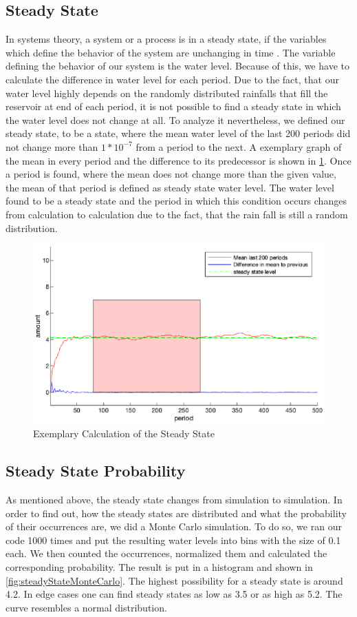 \documentclass[12pt, a4paper, oneside]{article}
\begin{document}
\subsection{Steady State}
In systems theory, a system or a process is in a steady state, if the variables which define the behavior of the system are unchanging in time \citep{gagniuc2017markov}. 
The variable defining the behavior of our system is the water level. 
Because of this, we have to calculate the difference in water level for each period. 
Due to the fact, that our water level highly depends on the randomly distributed rainfalls that fill the reservoir at end of each period, it is not possible to find a steady state in which the water level does not change at all. 
To analyze it nevertheless, we defined our steady state, to be a state, where the mean water level of the last 200 periods did not change more than $1*10^{-7}$ from a period to the next.
A exemplary graph of the mean in every period and the difference to its predecessor is shown in \ref{fig:steadyState}.
Once a period is found, where the mean does not change more than the given value, the mean of that period is defined as steady state water level.
The water level found to be a steady state and the period in which this condition occurs changes from calculation to calculation due to the fact, that the rain fall is still a random distribution.
\begin{figure}[ht]
	\includegraphics[width=1\textwidth]{figures/steadyState.eps}
	\caption{Exemplary Calculation of the Steady State}
	\label{fig:steadyState}
\end{figure}
\subsection{Steady State Probability}
As mentioned above, the steady state changes from simulation to simulation.
In order to find out, how the steady states are distributed and what the probability of their occurrences are, we did a Monte Carlo simulation.
To do so, we ran our code 1000 times and put the resulting water levels into bins with the size of 0.1 each.
We then counted the occurrences, normalized them and calculated the corresponding probability.
The result is put in a histogram and shown in \ref{fig:steadyStateMonteCarlo}.
The highest possibility for a steady state is around 4.2. 
In edge cases one can find steady states as low as 3.5 or as high as 5.2. 
The curve resembles a normal distribution. 
\end{document}
